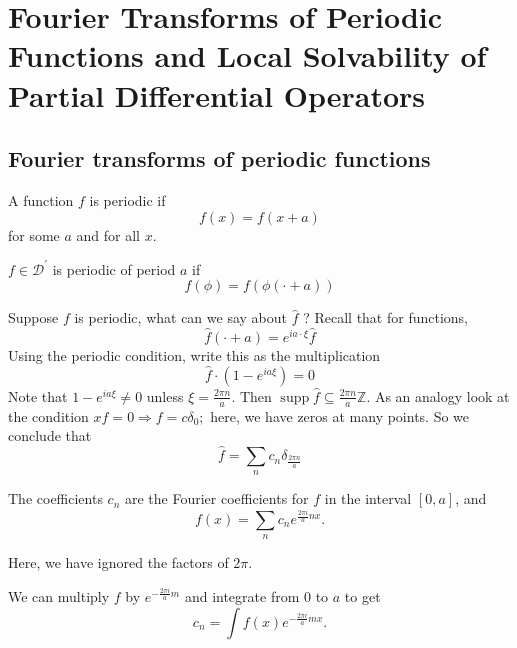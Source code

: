 \newpage

\section{Fourier Transforms of Periodic Functions and Local Solvability of Partial Differential Operators}

\subsection{Fourier transforms of periodic functions}
A function $f$ is periodic if
$$
f(x)=f(x+a)
$$
for some $a$ and for all $x$.

\begin{definition}
    [Periodic]
    $f \in \mathcal{D}^{\prime}$ is periodic of period $a$ if
$$
f(\phi)=f(\phi(\cdot+a))
$$
\end{definition}

Suppose $f$ is periodic, what can we say about $\widehat{f}$ ? Recall that for functions,
$$
\widehat{f}(\cdot+a)=e^{i a \cdot \xi} \hat{f}
$$
Using the periodic condition, write this as the multiplication
$$
\widehat{f} \cdot \left(1-e^{i a \xi}\right)=0
$$
Note that $1-e^{i a \xi} \neq 0$ unless $\xi=\frac{2 \pi n}{a}$. Then $\operatorname{supp} \widehat{f} \subseteq \frac{2 \pi n}{a} \mathbb{Z}$. As an analogy look at the condition $x f=0 \Longrightarrow f=c \delta_{0} ;$ here, we have zeros at many points. So we conclude that
$$
\widehat{f}=\sum_{n} c_{n} \delta_{\frac{2 \pi n}{a}}
$$

\begin{theorem}
The coefficients $c_n$ are the Fourier coefficients for $f$ in the interval $[0,a]$, and 
\[
    f(x) = \sum_n c_n e^{\frac{2\pi i}{a}nx}.
\]
\end{theorem}

Here, we have ignored the factors of $2\pi$.

\begin{remark}
    We can multiply $f$ by $e^{-\frac{2 \pi i}{a} m}$ and integrate from 0 to $a$ to get
    $$
    c_{n}=\int f(x) e^{-\frac{2 \pi i}{a} m x} .
    $$
\end{remark}

